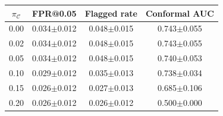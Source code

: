 \begin{tabular}{cccc}
\toprule
$\pi_{\mathcal{C}}$ & FPR@0.05 & Flagged rate & Conformal AUC \\
\midrule
0.00 & 0.034$\pm$0.012 & 0.048$\pm$0.015 & 0.743$\pm$0.055 \\
0.02 & 0.034$\pm$0.012 & 0.048$\pm$0.015 & 0.743$\pm$0.055 \\
0.05 & 0.034$\pm$0.012 & 0.048$\pm$0.015 & 0.740$\pm$0.053 \\
0.10 & 0.029$\pm$0.012 & 0.035$\pm$0.013 & 0.738$\pm$0.034 \\
0.15 & 0.026$\pm$0.012 & 0.027$\pm$0.013 & 0.685$\pm$0.106 \\
0.20 & 0.026$\pm$0.012 & 0.026$\pm$0.012 & 0.500$\pm$0.000 \\
\bottomrule
\end{tabular}
